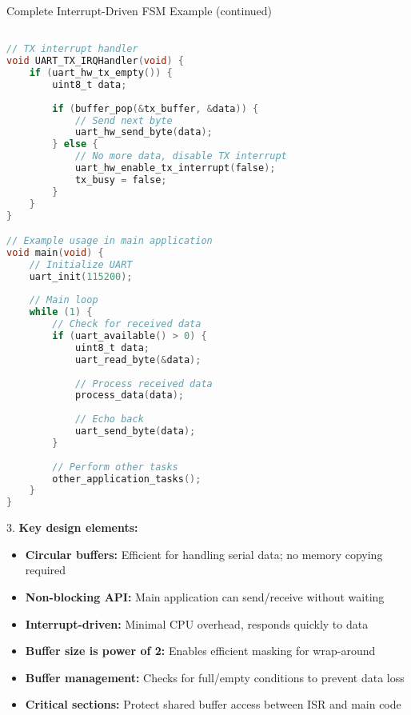 \begin{example2}{Complete Interrupt-Driven FSM Example (continued)}
\begin{lstlisting}[language=C, style=basesmol]

// TX interrupt handler
void UART_TX_IRQHandler(void) {
    if (uart_hw_tx_empty()) {
        uint8_t data;
        
        if (buffer_pop(&tx_buffer, &data)) {
            // Send next byte
            uart_hw_send_byte(data);
        } else {
            // No more data, disable TX interrupt
            uart_hw_enable_tx_interrupt(false);
            tx_busy = false;
        }
    }
}

// Example usage in main application
void main(void) {
    // Initialize UART
    uart_init(115200);
    
    // Main loop
    while (1) {
        // Check for received data
        if (uart_available() > 0) {
            uint8_t data;
            uart_read_byte(&data);
            
            // Process received data
            process_data(data);
            
            // Echo back
            uart_send_byte(data);
        }
        
        // Perform other tasks
        other_application_tasks();
    }
}
\end{lstlisting}

3. \textbf{Key design elements:}
   \begin{itemize}
     \item \textbf{Circular buffers:} Efficient for handling serial data; no memory copying required
     \item \textbf{Non-blocking API:} Main application can send/receive without waiting
     \item \textbf{Interrupt-driven:} Minimal CPU overhead, responds quickly to data
     \item \textbf{Buffer size is power of 2:} Enables efficient masking for wrap-around
     \item \textbf{Buffer management:} Checks for full/empty conditions to prevent data loss
     \item \textbf{Critical sections:} Protect shared buffer access between ISR and main code
   \end{itemize}


\end{example2}
